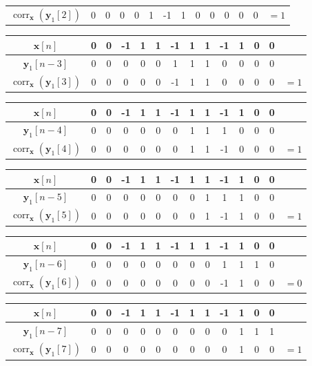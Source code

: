 \documentclass[]{article}
\renewcommand{\vec}[1]{\mathbf{#1}}
\newcommand{\corr}{\operatorname{corr}}
\begin{document}
\begin{flushleft}
\begin{tabular}{c|ccccccccccccc}
	\(\corr_{\vec{x}}(\vec{y}_1[2])\) & 0 & 0 & 0 & 0 & 1 & -1 & 1 & 0 & 0 & 0 & 0 & 0 & \(= 1\) \\
\end{tabular} \vspace{5 mm}
\begin{tabular}{c|ccccccccccccc}
	\(\vec{x}[n]\) & 0 & 0 & -1 & 1 & 1 & -1 & 1 & 1 & -1 & 1 & 0 & 0 \\
	\hline
	\(\vec{y}_1[n - 3]\) & 0 & 0 & 0 & 0 & 0 & 1 & 1 & 1 & 0 & 0 & 0 & 0 \\
	\(\corr_{\vec{x}}({\vec{y}_1}[3])\) & 0 & 0 & 0 & 0 & 0 & -1 & 1 & 1 & 0 & 0 & 0 & 0 & \(= 1\) \\
\end{tabular} \vspace{5 mm}
\begin{tabular}{c|ccccccccccccc}
	\(\vec{x}[n]\) & 0 & 0 & -1 & 1 & 1 & -1 & 1 & 1 & -1 & 1 & 0 & 0 \\
	\hline
	\(\vec{y}_1[n - 4]\) & 0 & 0 & 0 & 0 & 0 & 0 & 1 & 1 & 1 & 0 & 0 & 0 \\
	\(\corr_{\vec{x}}(\vec{y}_1[4])\) & 0 & 0 & 0 & 0 & 0 & 0 & 1 & 1 & -1 & 0 & 0 & 0 & \(= 1\) \\
\end{tabular} \vspace{5 mm}
\begin{tabular}{c|ccccccccccccc}
	\(\vec{x}[n]\) & 0 & 0 & -1 & 1 & 1 & -1 & 1 & 1 & -1 & 1 & 0 & 0 \\
	\hline
	\(\vec{y}_1[n - 5]\) & 0 & 0 & 0 & 0 & 0 & 0 & 0 & 1 & 1 & 1 & 0 & 0 \\
	\(\corr_{\vec{x}}(\vec{y}_1[5])\) & 0 & 0 & 0 & 0 & 0 & 0 & 0 & 1 & -1 & 1 & 0 & 0 & \(= 1\) \\
\end{tabular} \vspace{5 mm}
\begin{tabular}{c|ccccccccccccc}
	\(\vec{x}[n]\) & 0 & 0 & -1 & 1 & 1 & -1 & 1 & 1 & -1 & 1 & 0 & 0 \\
	\hline
	\(\vec{y}_1[n - 6]\) & 0 & 0 & 0 & 0 & 0 & 0 & 0 & 0 & 1 & 1 & 1 & 0 \\
	\(\corr_{\vec{x}}(\vec{y}_1[6])\) & 0 & 0 & 0 & 0 & 0 & 0 & 0 & 0 & -1 & 1 & 0 & 0 & \(= 0\) \\
\end{tabular} \vspace{5 mm}
\begin{tabular}{c|ccccccccccccc}
	\(\vec{x}[n]\) & 0 & 0 & -1 & 1 & 1 & -1 & 1 & 1 & -1 & 1 & 0 & 0 \\
	\hline
	\(\vec{y}_1[n - 7]\) & 0 & 0 & 0 & 0 & 0 & 0 & 0 & 0 & 0 & 1 & 1 & 1 \\
	\(\corr_{\vec{x}}(\vec{y}_1[7])\) & 0 & 0 & 0 & 0 & 0 & 0 & 0 & 0 & 0 & 1 & 0 & 0 & \(= 1\) \\
\end{tabular} \vspace{5 mm}
\end{flushleft}
\end{document}
